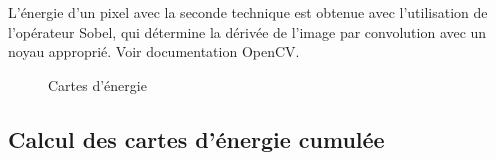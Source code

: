 \documentclass[a4paper]{article}
\begin{document}
L'énergie d'un pixel avec la seconde technique est obtenue avec l'utilisation de l'opérateur Sobel, qui détermine la dérivée de l'image par convolution avec un noyau approprié. Voir documentation OpenCV.


\begin{figure}[!ht]%
    \centering
    \hspace{0.030\textwidth}
    \caption{Cartes d'énergie}
    \label{energie}
\end{figure}

\subsection{Calcul des cartes d'énergie cumulée}
\end{document}
